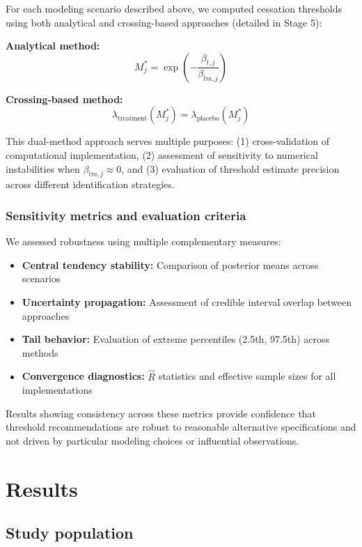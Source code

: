 \documentclass[11pt]{article}\usepackage[]{graphicx}\usepackage[]{xcolor}
\begin{document}
For each modeling scenario described above, we computed cessation thresholds using both analytical and crossing-based approaches (detailed in Stage 5):

\textbf{Analytical method:}
\begin{equation}
M^*_j = \exp\left(-\frac{\beta_{t,j}}{\beta_{tm,j}}\right)
\end{equation}

\textbf{Crossing-based method:}
\begin{equation}
\lambda_{\text{treatment}}(M^*_j) = \lambda_{\text{placebo}}(M^*_j)
\end{equation}

This dual-method approach serves multiple purposes: (1) cross-validation of computational implementation, (2) assessment of sensitivity to numerical instabilities when $\beta_{tm,j} \approx 0$, and (3) evaluation of threshold estimate precision across different identification strategies.

\subsubsection{Sensitivity metrics and evaluation criteria}

We assessed robustness using multiple complementary measures:
\begin{itemize}
\item \textbf{Central tendency stability:} Comparison of posterior means across scenarios
\item \textbf{Uncertainty propagation:} Assessment of credible interval overlap between approaches  
\item \textbf{Tail behavior:} Evaluation of extreme percentiles (2.5th, 97.5th) across methods
\item \textbf{Convergence diagnostics:} $\hat{R}$ statistics and effective sample sizes for all implementations
\end{itemize}

Results showing consistency across these metrics provide confidence that threshold recommendations are robust to reasonable alternative specifications and not driven by particular modeling choices or influential observations.

\section{Results}

\subsection{Study population}
\end{document}
